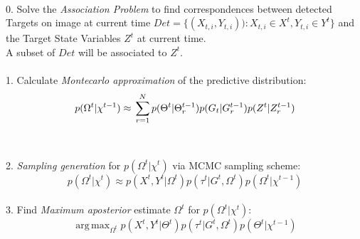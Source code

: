 {\\
0. Solve the \textit{Association Problem} to find correspondences between detected Targets on image at current time $Det=\{(X_{t,i}, Y_{t,i})):X_{t,i} \in X^t,Y_{t,i} \in Y^t\}$ and the Target State Variables $Z^{t}$ at current time.\\
A subset  of $Det$ will be associated to $Z^t$.\\ 
\\
1. Calculate \textit{Montecarlo approximation} of the predictive distribution:\\
$$
 p(\Omega^{t} |\chi^{t-1}) \approx \\ \nonumber
\sum_{r=1}^{N} p(\Theta^{t} | \Theta^{t-1}_r) p(G_t |G^{t-1}_r) p(Z^t |Z^{t-1}_r) 
$$
\\
\\
2. \textit{Sampling generation} for $p(\Omega^{t} |\chi^{t})$ via MCMC sampling scheme:\\
$$
p(\Omega^{t} |\chi^{t}) \approx  p(X^{t}, Y^t |\Omega^{t}) p(\tau^{t} | G^t ,\Omega^{t}) 
p(\Omega^{t} |\chi^{t-1})
$$
\\
3. Find \textit{Maximum aposterior} estimate $\Omega^{t}$ for $p(\Omega^{t} |\chi^{t})$:\\
\[
 \operatorname{arg\,max}_{\Omega^{t}} p(X^{t}, Y^t |\Theta^{t}) p(\tau^{t} | G^t ,\Omega^{t}) p(\Theta^{t} |\chi^{t-1}) 
\]
}\\[.4cm]
\\
\\

